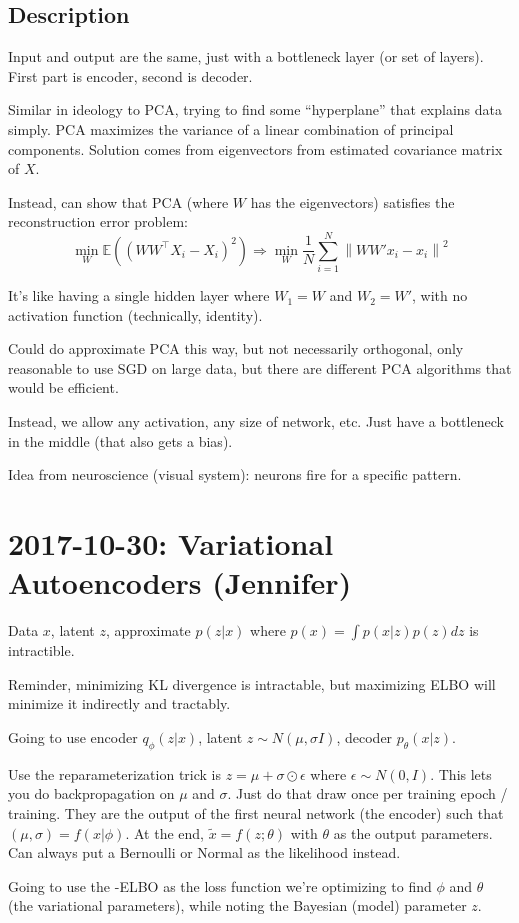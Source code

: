 \documentclass{article}
\newcommand{\norm}[1]{{ \ensuremath{ \left\lVert  #1 \right\rVert  }  }}
\newcommand{\E}{ \ensuremath{ \mathbb{E} }}
\begin{document}
\subsection{Description}
Input and output are the same, just with a bottleneck layer (or set of layers). First part is encoder, second is
decoder.

Similar in ideology to PCA, trying to find some ``hyperplane'' that explains data simply. PCA maximizes
the variance of a linear combination of principal components. Solution comes from eigenvectors from estimated
covariance matrix of $X$.

Instead, can show that PCA (where $W$ has the eigenvectors) satisfies the reconstruction error problem:
\begin{equation*}
  \min_W\E \left( (WW^\top X_i - X_i)^2 \right)\Rightarrow\min_W \frac{1}{N} \sum_{i=1}^N\norm{WW'x_i-x_i}^2
\end{equation*}

It's like having a single hidden layer where $W_1=W$ and $W_2=W'$, with no activation function (technically, identity).

Could do approximate PCA this way, but not necessarily orthogonal, only reasonable to use SGD on large data, but there
are different PCA algorithms that would be efficient.

Instead, we allow any activation, any size of network, etc. Just have a bottleneck in the middle (that also gets a bias).

Idea from neuroscience (visual system): neurons fire for a specific pattern.


\section{2017-10-30: Variational Autoencoders (Jennifer)}

Data $x$, latent $z$, approximate $p(z|x)$ where $p(x)=\int p(x|z)p(z)dz$ is intractible.

Reminder, minimizing KL divergence is intractable, but maximizing ELBO will minimize it indirectly and tractably.

Going to use encoder $q_\phi(z|x)$, latent $z\sim N(\mu, \sigma I)$, decoder $p_\theta(x|z)$.

Use the reparameterization trick is $z=\mu+\sigma \odot \epsilon$ where $\epsilon\sim N(0,I)$. This lets you do
backpropagation on $\mu$ and $\sigma$. Just do that draw once per training epoch / training. They are the output of the first
neural network (the encoder) such that $(\mu, \sigma)=f(x|\phi)$. At the end, $\tilde{x}=f(z;\theta)$ with $\theta$ as the
output parameters. Can always put a Bernoulli or Normal as the likelihood instead.

Going to use the -ELBO as the loss function we're optimizing to find $\phi$ and $\theta$ (the variational parameters), while
noting the Bayesian (model) parameter $z$.


\end{document}
